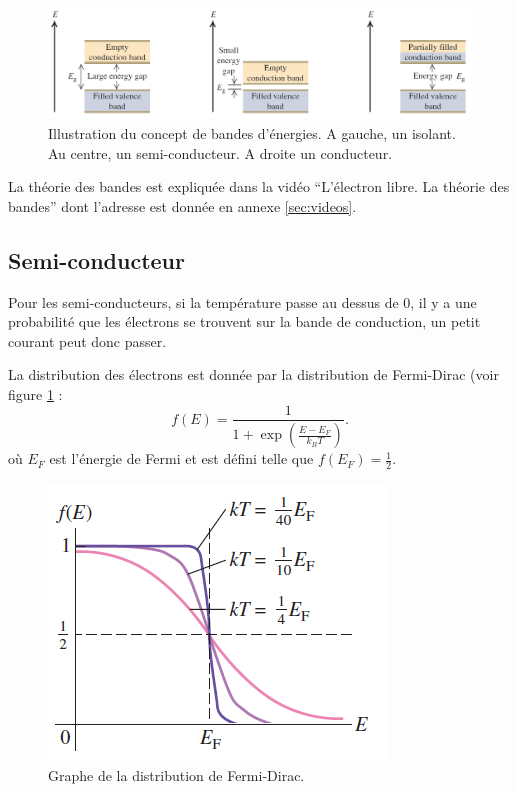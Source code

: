 \begin{figure}[ht]
	\centering
	\includegraphics[scale=0.8]{img/band.png}
	\caption{Illustration du concept de bandes d'énergies.
	A gauche, un isolant. Au centre, un semi-conducteur. A droite
	un conducteur.}
\end{figure}

La théorie des bandes est expliquée dans la vidéo 
``L'électron libre. La théorie des bandes''
dont l'adresse est donnée en annexe \ref{sec:videos}.
\subsection{Semi-conducteur}
Pour les semi-conducteurs,
si la température passe au dessus de \si{0}{\kelvin},
il y a une probabilité que les électrons
se trouvent sur la bande de conduction,
un petit courant peut donc passer.

La distribution des électrons est donnée par la distribution de Fermi-Dirac
(voir figure \ref{fig:fermi-dirac} :
\[ f(E) = \frac{1}{1+\exp\left(\frac{E-E_F}{k_BT}\right)}. \]
où $E_F$ est l'énergie de Fermi et est défini telle que
$f(E_F) = \frac{1}{2}$.

\begin{figure}[ht]
	\centering
	\includegraphics[scale=0.8]{img/fermi-dirac.png}
	\caption{Graphe de la distribution de Fermi-Dirac.}
	\label{fig:fermi-dirac}
\end{figure}

